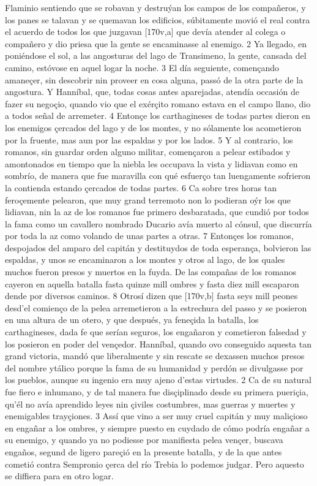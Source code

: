 \documentclass[11pt,twoside]{article}\makeatletter
\def\persName{}\def\name{}
\begin{document}
\pend
{} Flaminio sentiendo que se robavan y destruýan los campos de los compañeros, y los panes se talavan y se quemavan los edificios, súbitamente movió el real contra el acuerdo de todos los que juzgavan %
[170v,a] que devía atender al colega o compañero y dio priesa que la gente se encaminasse al enemigo. 2 Ya llegado, en poniéndose el sol, a las angosturas del lago de Transimeno, la gente, cansada del camino, estóvose en aquel logar la noche. 3 El día seguiente, començando amaneçer, sin descobrir nin proveer en cosa alguna, passó de la otra parte de la angostura. Y  {\persName Hanníbal}, que, todas cosas antes aparejadas, atendía occasión de fazer su negoçio, quando vio que el exérçito romano estava en el campo llano, dio a todos señal de arremeter. 4 Entonçe los  {\name carthagineses} de todas partes dieron en los enemigos çercados del lago y de los montes, y no sólamente los acometieron por la fruente, mas aun por las espaldas y por los lados. 5 Y al contrario, los romanos, sin guardar orden alguno militar, començaron a pelear estibados y amontonados en tiempo que la niebla les occupava la vista y lidiavan como en sombrío, de manera que fue maravilla con qué esfuerço tan luengamente sofrieron la contienda estando çercados de todas partes. 6 Ca sobre tres horas tan feroçemente pelearon, que muy grand terremoto non lo podieran oýr los que lidiavan, nin la az de los romanos fue primero desbaratada, que cundió por todos la fama como un cavallero nombrado Ducario avía muerto al cónsul, que discurría por toda la az como volando de unas partes a otras. 7 Entonçes los romanos, despojados del amparo del capitán y destituydos de toda esperança, bolvieron las espaldas, y unos se encaminaron a los montes y otros al lago, de los quales muchos fueron presos y muertos en la fuyda. De las compañas de los romanos cayeron en aquella batalla fasta quinze mill ombres y fasta diez mill escaparon dende por diversos caminos. 8 Otrosí dizen que %
[170v,b] fasta seys mill peones desd’el comienço de la pelea arremetieron a la estrechura del passo y se posieron en una altura de un otero, y que después, ya feneçida la batalla, los  {\name carthagineses}, dada fe que serían seguros, los engañaron y cometieron falsedad y los posieron en poder del vençedor.
\pend
{}  {\persName Hanníbal}, quando ovo conseguido aquesta tan grand victoria, mandó que liberalmente y sin rescate se dexassen muchos presos del nombre ytálico porque la fama de su humanidad y perdón se divulgasse por los pueblos, aunque su ingenio era muy ajeno d’estas virtudes. 2 Ca de su natural fue fiero e inhumano, y de tal manera fue disçiplinado desde su primera pueriçia, qu’él no avía aprendido leyes nin çiviles costumbres, mas guerras y muertes y enemigables trayçiones. 3 Assí que vino a ser muy cruel capitán y muy maliçioso en engañar a los ombres, y siempre puesto en cuydado de cómo podría engañar a su enemigo, y quando ya no podiesse por manifiesta pelea vençer, buscava engaños, segund de ligero pareçió en la presente batalla, y de la que antes cometió contra Sempronio çerca del río Trebia lo podemos judgar. Pero aquesto se diffiera para en otro logar.
\end{document}
